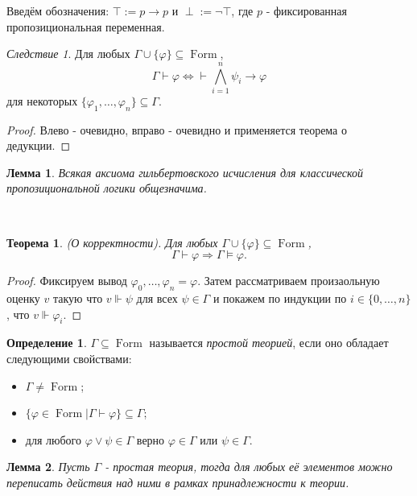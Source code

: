 \documentclass[a4paper,100pt]{article}
\theoremstyle{indented}
\newtheorem{theorem}{Теорема}
\newtheorem{lemma}{Лемма}
\theoremstyle{definition}
\newtheorem{defn}{Определение}
\theoremstyle{remark}
\newtheorem{cons}{Следствие}
\DeclareMathOperator{\form}{Form}
\begin{document}
Введём обозначения: $\top:= p\rightarrow p$ и $\perp := \neg \top$, где $p$ - фиксированная пропозициональная переменная.

\begin{cons}
  Для любых $\Gamma\cup \{\varphi\}\subseteq \form$, 
  \[
    \Gamma \vdash \varphi \Longleftrightarrow \vdash \bigwedge_{i=1}^n \psi_i\rightarrow \varphi
  \]
  для некоторых $\{\varphi_1, \ldots, \varphi_n\}\subseteq \Gamma$.
\end{cons}

\begin{proof}
  Влево - очевидно, вправо - очевидно и применяется теорема о дедукции.
\end{proof}

\begin{lemma}
  Всякая аксиома гильбертовского исчисления для классической пропозициональной логики общезначима.
\end{lemma}\ 


\begin{theorem}
  (О корректности). Для любых $\Gamma \cup \{\varphi\}\subseteq \form$, 
  \[
    \Gamma \vdash \varphi \Longrightarrow \Gamma \vDash \varphi. 
  \]
\end{theorem}

\begin{proof}
  Фиксируем вывод $\varphi_0, \ldots, \varphi_n = \varphi$. Затем рассматриваем произаольную оценку $v$ такую что $v\Vdash \psi$ для всех $\psi \in \Gamma$ и покажем по индукции по $i\in\{0, \ldots, n\}$, что $v\Vdash \varphi_i$.
\end{proof}

\begin{defn}
  $\Gamma \subseteq \form$ называется \textit{простой теорией}, если оно обладает следующими свойствами:

  \begin{itemize}
    \item $\Gamma \neq \form$; 
    \item $\{\varphi \in \form |\Gamma \vdash \varphi\}\subseteq \Gamma$; 
    \item для любого $\varphi \vee \psi \in \Gamma$ верно $\varphi \in \Gamma$ или $\psi \in \Gamma$. 
  \end{itemize}
\end{defn}

\begin{lemma}
  Пусть $\Gamma$ - простая теория, тогда для любых её элементов можно переписать действия над ними в рамках принадлежности к теории.
\end{lemma}\
\end{document}
